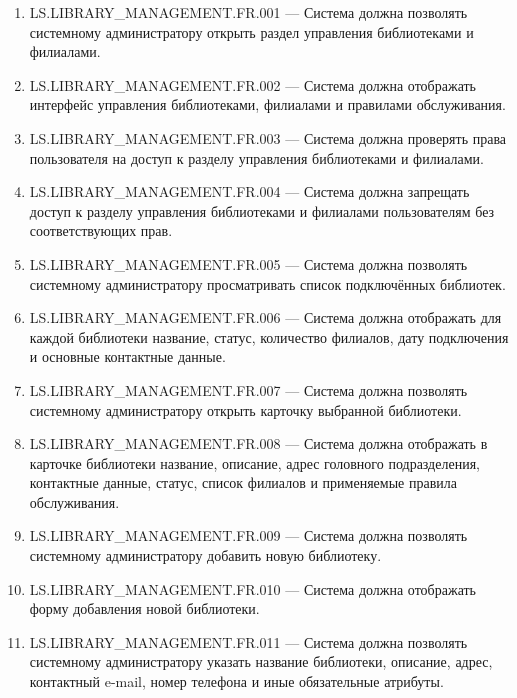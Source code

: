 \documentclass[12pt,a4paper]{article}
\begin{document}
	\begin{enumerate}
		\item LS.LIBRARY\_MANAGEMENT.FR.001 --- Система должна позволять системному
		администратору открыть раздел управления библиотеками и филиалами.
		
		\item LS.LIBRARY\_MANAGEMENT.FR.002 --- Система должна отображать интерфейс
		управления библиотеками, филиалами и правилами обслуживания.
		
		\item LS.LIBRARY\_MANAGEMENT.FR.003 --- Система должна проверять права пользователя
		на доступ к разделу управления библиотеками и филиалами.
		
		\item LS.LIBRARY\_MANAGEMENT.FR.004 --- Система должна запрещать доступ к разделу
		управления библиотеками и филиалами пользователям без соответствующих прав.
		
		\item LS.LIBRARY\_MANAGEMENT.FR.005 --- Система должна позволять системному
		администратору просматривать список подключённых библиотек.
		
		\item LS.LIBRARY\_MANAGEMENT.FR.006 --- Система должна отображать для каждой
		библиотеки название, статус, количество филиалов, дату подключения и основные
		контактные данные.
		
		\item LS.LIBRARY\_MANAGEMENT.FR.007 --- Система должна позволять системному
		администратору открыть карточку выбранной библиотеки.
		
		\item LS.LIBRARY\_MANAGEMENT.FR.008 --- Система должна отображать в карточке
		библиотеки название, описание, адрес головного подразделения, контактные данные,
		статус, список филиалов и применяемые правила обслуживания.
		
		\item LS.LIBRARY\_MANAGEMENT.FR.009 --- Система должна позволять системному
		администратору добавить новую библиотеку.
		
		\item LS.LIBRARY\_MANAGEMENT.FR.010 --- Система должна отображать форму добавления
		новой библиотеки.
		
		\item LS.LIBRARY\_MANAGEMENT.FR.011 --- Система должна позволять системному
		администратору указать название библиотеки, описание, адрес, контактный e-mail,
		номер телефона и иные обязательные атрибуты.
		

\end{enumerate}
\end{document}
